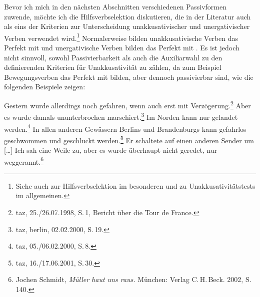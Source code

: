 

Bevor ich mich in den nächsten Abschnitten verschiedenen Passivformen zuwende,
möchte ich die Hilfsverbselektion diskutieren, die in der Literatur auch als
eins der Kriterien zur Unterscheidung unakkusativischer und unergativischer Verben verwendet
wird.\footnote{
  Siehe auch  zur Hilfsverbselektion im besonderen und
  zu Unakkusativitätstests im allgemeinen.
}
Normalerweise bilden unakkusativische Verben das Perfekt mit \seinp
und unergativische Verben bilden das Perfekt mit \habenp. Es ist jedoch nicht sinnvoll,
sowohl Passivierbarkeit als auch die Auxiliarwahl zu den definierenden Kriterien für
Unakkusativität zu zählen, da zum Beispiel Bewegungsverben
das Perfekt mit \sein bilden, aber dennoch passivierbar sind, wie die folgenden Beispiele zeigen:
\begin{sloppypar}
\eal
\ex{}
Gestern wurde allerdings noch gefahren, wenn auch erst mit Verzögerung.\footnote{
        taz, 25./26.07.1998, S.\,1, Bericht über die Tour de France.%
}
\ex{}
Aber es wurde damals ununterbrochen marschiert.\footnote{
        taz, berlin, 02.02.2000, S.\,19.%
}
\ex{}
Im Norden kann nur gelandet werden.\footnote{
         taz, 05./06.02.2000, S.\,8.%
}
\ex{}
In allen anderen Gewässern Berlins und Brandenburgs kann gefahrlos geschwommen und geschluckt werden.\footnote{
         taz, 16./17.06.2001, S.\,30.%
}
\ex Er schaltete auf einen anderen Sender um [\ldots] Ich sah eine Weile
zu, aber es wurde überhaupt nicht geredet, nur weggerannt.\footnote{
        Jochen Schmidt, \emph{Müller haut uns raus.} München: Verlag C.\,H.\,Beck. 2002, S.\,140.%
}
\zl
\end{sloppypar}

